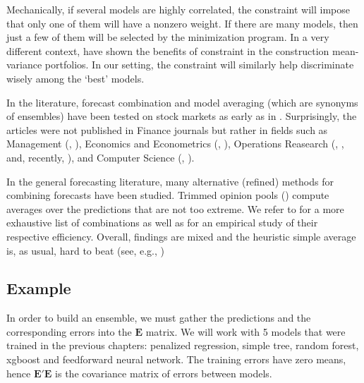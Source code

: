 \documentclass[]{krantz}
\theoremstyle{definition}
\theoremstyle{definition}
\theoremstyle{definition}
\theoremstyle{remark}
\begin{document}
Mechanically, if several models are highly correlated, the constraint
will impose that only one of them will have a nonzero weight. If there
are many models, then just a few of them will be selected by the
minimization program. In a very different context,
\citet{jagannathan2003risk} have shown the benefits of constraint in the
construction mean-variance portfolios. In our setting, the constraint
will similarly help discriminate wisely among the `best' models.

In the literature, forecast combination and model averaging (which are
synonyms of ensembles) have been tested on stock markets as early as in
\citet{von1972probabilistic}. Surprisingly, the articles were not
published in Finance journals but rather in fields such as Management
(\citet{virtanen1987forecasting}, \citet{wang2012stock}), Economics and
Econometrics (\citet{donaldson1996forecast},
\citet{clark2009improving}), Operations Reasearch
(\citet{huang2005forecasting}, \citet{leung2001using}, and, recently,
\citet{bonaccolto2019developing}), and Computer Science
(\citet{harrald1997evolving}, \citet{hassan2007fusion}).

In the general forecasting literature, many alternative (refined)
methods for combining forecasts have been studied. Trimmed opinion pools
(\citet{grushka2016ensembles}) compute averages over the predictions
that are not too extreme. We refer to \citet{gaba2017combining} for a
more exhaustive list of combinations as well as for an empirical study
of their respective efficiency. Overall, findings are mixed and the
heuristic simple average is, as usual, hard to beat (see, e.g.,
\citet{genre2013combining})

\hypertarget{example}{%
\subsection{Example}\label{example}}

In order to build an ensemble, we must gather the predictions and the
corresponding errors into the \(\textbf{E}\) matrix. We will work with 5
models that were trained in the previous chapters: penalized regression,
simple tree, random forest, xgboost and feedforward neural network. The
training errors have zero means, hence \(\textbf{E}'\textbf{E}\) is the
covariance matrix of errors between models.

\footnotesize
\end{document}

